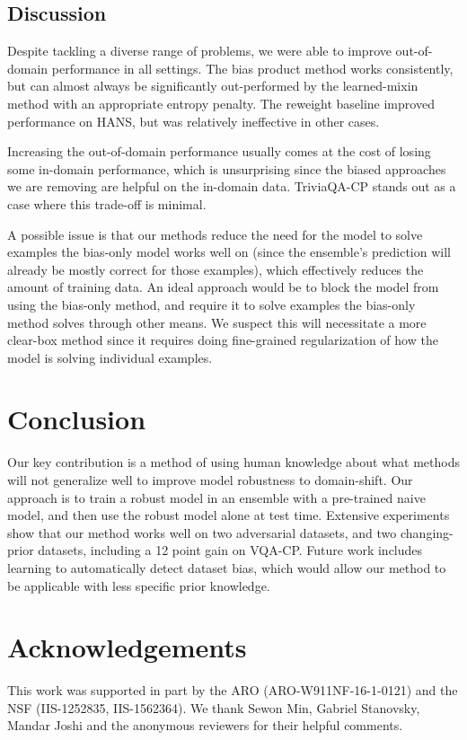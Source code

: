 \documentclass[11pt,a4paper]{article}
\begin{document}
\subsection{Discussion}
Despite tackling a diverse range of problems, we were able to improve out-of-domain performance in all settings. The bias product method works consistently, but can almost always be significantly out-performed by the learned-mixin method with an appropriate entropy penalty. The reweight baseline improved performance on HANS, but was relatively ineffective in other cases. 

Increasing the out-of-domain performance usually comes at the cost of losing some in-domain performance, which is unsurprising since the biased approaches we are removing are helpful on the in-domain data. TriviaQA-CP stands out as a case where this trade-off is minimal.

A possible issue is that our methods reduce the need for the model to solve examples the bias-only model works well on (since the ensemble's prediction will already be mostly correct for those examples), which effectively reduces the amount of training data. An ideal approach would be to block the model from using the bias-only method, and require it to solve examples the bias-only method solves through other means. 
We suspect this will necessitate a more clear-box method since it requires doing fine-grained regularization of how the model is solving individual examples.
 


\section{Conclusion}
Our key contribution is a method of using human knowledge about what methods will not generalize well to improve model robustness to domain-shift. 
Our approach is to train a robust model in an ensemble with a pre-trained naive model, and then use the robust model alone at test time. Extensive experiments show that our method works well on two adversarial datasets, and two changing-prior datasets, including a 12 point gain on VQA-CP. Future work includes learning to automatically detect dataset bias, which would allow our method to be applicable with less specific prior knowledge. 
\section*{Acknowledgements}
This work was supported in part by the ARO (ARO-W911NF-16-1-0121) and the NSF (IIS-1252835, IIS-1562364). We thank Sewon Min, Gabriel Stanovsky, Mandar Joshi and the anonymous reviewers for their helpful comments.
 
\end{document}
